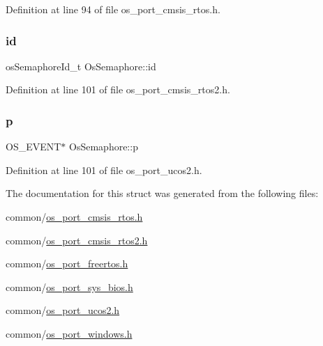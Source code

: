 Definition at line 94 of file os\+\_\+port\+\_\+cmsis\+\_\+rtos.\+h.

\mbox{\label{structOsSemaphore_a5fe036ca34ddf8add030ac20995157af}} 
\subsubsection{\texorpdfstring{id}{id}\hspace{0.1cm}{\footnotesize\ttfamily [2/2]}}
{\footnotesize\ttfamily os\+Semaphore\+Id\+\_\+t Os\+Semaphore\+::id}



Definition at line 101 of file os\+\_\+port\+\_\+cmsis\+\_\+rtos2.\+h.

\mbox{\label{structOsSemaphore_acbca71c74ddf512be48f0e9214b5391e}} 
\subsubsection{\texorpdfstring{p}{p}}
{\footnotesize\ttfamily O\+S\+\_\+\+E\+V\+E\+NT$\ast$ Os\+Semaphore\+::p}



Definition at line 101 of file os\+\_\+port\+\_\+ucos2.\+h.



The documentation for this struct was generated from the following files\+:\begin{DoxyCompactItemize}
\item 
common/\hyperlink{os__port__cmsis__rtos_8h}{os\+\_\+port\+\_\+cmsis\+\_\+rtos.\+h}\item 
common/\hyperlink{os__port__cmsis__rtos2_8h}{os\+\_\+port\+\_\+cmsis\+\_\+rtos2.\+h}\item 
common/\hyperlink{os__port__freertos_8h}{os\+\_\+port\+\_\+freertos.\+h}\item 
common/\hyperlink{os__port__sys__bios_8h}{os\+\_\+port\+\_\+sys\+\_\+bios.\+h}\item 
common/\hyperlink{os__port__ucos2_8h}{os\+\_\+port\+\_\+ucos2.\+h}\item 
common/\hyperlink{os__port__windows_8h}{os\+\_\+port\+\_\+windows.\+h}\end{DoxyCompactItemize}
